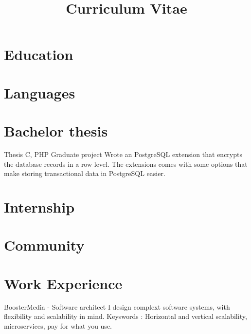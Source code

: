 \documentclass[11pt,a4paper]{moderncv}
\title{Curriculum Vitae}
\begin{document}
\maketitle

\section{Education}

\section{Languages}

\section{Bachelor thesis}
{Thesis}
{C, PHP}
{Graduate project}{}
{
Wrote an PostgreSQL extension that encrypts the database records in a row
level. The extensions comes with some options that make storing transactional
data in PostgreSQL easier.
}

\section{Internship}

\section{Community}

\section{Work Experience}

\vspace*{0.2\baselineskip}
{BoosterMedia - Software architect}
{}
{}
{}
{
I design complext software systems, with flexibility and scalability in mind.
Keyswords : Horizontal and vertical scalability, microservices, pay for what
you use. 
}
\end{document}
